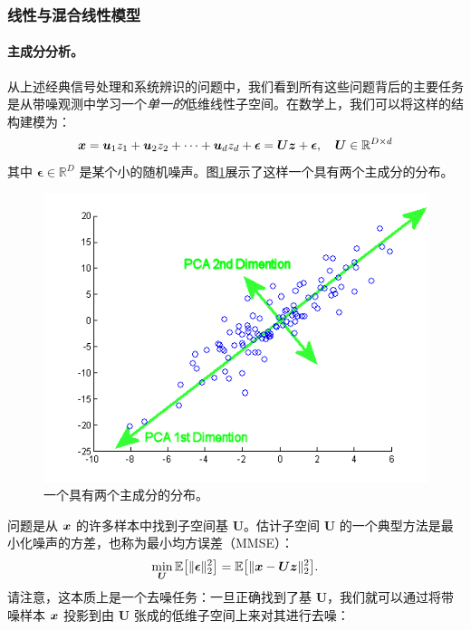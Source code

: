 \documentclass[../../book-main.tex]{subfiles}
\begin{document}

\subsubsection{线性与混合线性模型}
\label{sec:PCA-ICA}
\paragraph{主成分分析。}
从上述经典信号处理和系统辨识的问题中，我们看到所有这些问题背后的主要任务是从带噪观测中学习一个{\em 单一的}低维线性子空间。在数学上，我们可以将这样的结构建模为：
\begin{equation}
    \bm{x} = \boldsymbol{u}_1 z_1 + \boldsymbol{u}_2 z_2 + \cdots + \boldsymbol{u}_d z_d + \boldsymbol{\epsilon} =  \boldsymbol{U} \bm{z} + \boldsymbol{\epsilon}, \quad \boldsymbol{U} \in \mathbb{R}^{D\times d}
    \label{eqn:PCA-model}
\end{equation}
其中 $\boldsymbol{\epsilon} \in \mathbb{R}^D$ 是某个小的随机噪声。图\ref{fig:PCA}展示了这样一个具有两个主成分的分布。
\begin{figure}
    \centering
    \includegraphics[width=0.5\linewidth]{figures/PCA.png}
    \caption{一个具有两个主成分的分布。}
    \label{fig:PCA}
\end{figure}
问题是从 $\bm{x}$ 的许多样本中找到子空间基 $\boldsymbol{U}$。估计子空间 $\boldsymbol{U}$ 的一个典型方法是最小化噪声的方差，也称为最小均方误差（MMSE）：
\begin{equation}
    \min_{\boldsymbol{U}} \mathbb{E}\big[\|\boldsymbol{\epsilon}\|_2^2\big] = \mathbb{E}\big[\|\bm{x} - \boldsymbol{U} \bm{z}\|_2^2\big].
\end{equation}
请注意，这本质上是一个去噪任务：一旦正确找到了基 $\boldsymbol{U}$，我们就可以通过将带噪样本 $\bm{x}$ 投影到由 $\boldsymbol{U}$ 张成的低维子空间上来对其进行去噪：
\end{document}
